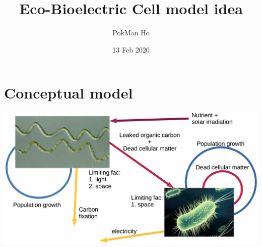 \documentclass[a4paper,11pt]{article}
\title{Eco-Bioelectric Cell model idea}
\author{PokMan Ho}
\date{13 Feb 2020}
\begin{document}
    \maketitle
    \tableofcontents
    
    \section{Conceptual model}
    \includegraphics[width=\linewidth]{sandbox/graph/model_01.png}
    
\end{document}
